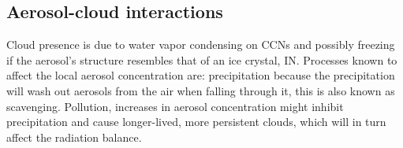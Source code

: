 \subsection{Aerosol-cloud interactions}

Cloud presence is due to water vapor condensing on CCNs and possibly freezing if the aerosol's structure resembles that of an ice crystal, IN. Processes known to affect the local aerosol concentration are: precipitation because the precipitation will wash out aerosols from the air when falling through it, this is also known as scavenging. Pollution, increases in aerosol concentration might inhibit precipitation and cause longer-lived, more persistent clouds, which will in turn affect the radiation balance.


 